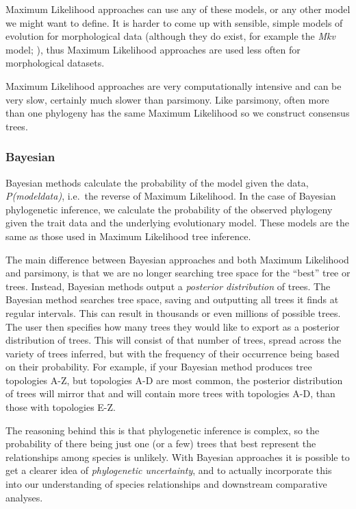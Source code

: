 \documentclass[]{book}
\begin{document}
Maximum Likelihood approaches can use any of these models, or any other
model we might want to define. It is harder to come up with sensible,
simple models of evolution for morphological data (although they do
exist, for example the \emph{Mkv} model; \citep{lewis2001likelihood}),
thus Maximum Likelihood approaches are used less often for morphological
datasets.

Maximum Likelihood approaches are very computationally intensive and can
be very slow, certainly much slower than parsimony. Like parsimony,
often more than one phylogeny has the same Maximum Likelihood so we
construct consensus trees.

\subsubsection{Bayesian}\label{bayesian}

Bayesian methods calculate the probability of the model given the data,
\emph{P(model\textbar{}data)}, i.e.~the reverse of Maximum Likelihood.
In the case of Bayesian phylogenetic inference, we calculate the
probability of the observed phylogeny given the trait data and the
underlying evolutionary model. These models are the same as those used
in Maximum Likelihood tree inference.

The main difference between Bayesian approaches and both Maximum
Likelihood and parsimony, is that we are no longer searching tree space
for the ``best'' tree or trees. Instead, Bayesian methods output a
\emph{posterior distribution} of trees. The Bayesian method searches
tree space, saving and outputting all trees it finds at regular
intervals. This can result in thousands or even millions of possible
trees. The user then specifies how many trees they would like to export
as a posterior distribution of trees. This will consist of that number
of trees, spread across the variety of trees inferred, but with the
frequency of their occurrence being based on their probability. For
example, if your Bayesian method produces tree topologies A-Z, but
topologies A-D are most common, the posterior distribution of trees will
mirror that and will contain more trees with topologies A-D, than those
with topologies E-Z.

The reasoning behind this is that phylogenetic inference is complex, so
the probability of there being just one (or a few) trees that best
represent the relationships among species is unlikely. With Bayesian
approaches it is possible to get a clearer idea of \emph{phylogenetic
uncertainty}, and to actually incorporate this into our understanding of
species relationships and downstream comparative analyses.
\end{document}
